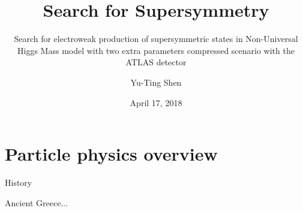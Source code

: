 \documentclass{beamer}
\title[PhD Defense]{Search for Supersymmetry}
\subtitle{Search for electroweak production of supersymmetric states in Non-Universal Higgs Mass model with two extra parameters compressed scenario with the ATLAS detector}
\author[Yu-Ting]{Yu-Ting Shen}
\institute[OU]{Department of Physics and Astronomy\\The University of Oklahoma}
\date{April 17, 2018}
\begin{document}
\begin{frame}
    \titlepage
\end{frame}



\section{Particle physics overview}

{

\begin{frame}{History}
    \begin{center}
        \Huge{Ancient Greece...}
    \end{center}
\end{frame}

}
\end{document}
